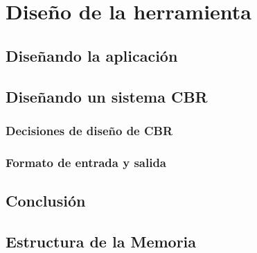 \newpage
\section {Diseño de la herramienta}
\subsection{Diseñando la aplicación}
\subsection{Diseñando un sistema CBR}
\subsubsection{Decisiones de diseño de CBR}
\subsubsection{Formato de entrada y salida}
\subsection{Conclusión}
\subsection{Estructura de la Memoria}

